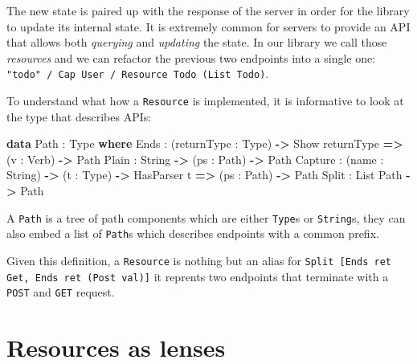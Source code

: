 \documentclass[sigplan,screen,review, nonacm]{acmart}
\newenvironment{Shaded}{}{}
\newcommand{\DataTypeTok}[1]{\textcolor[rgb]{0.56,0.13,0.00}{#1}}
\newcommand{\FunctionTok}[1]{\textcolor[rgb]{0.02,0.16,0.49}{#1}}
\newcommand{\KeywordTok}[1]{\textcolor[rgb]{0.00,0.44,0.13}{\textbf{#1}}}
\newcommand{\OperatorTok}[1]{\textcolor[rgb]{0.40,0.40,0.40}{#1}}
\newcommand{\OtherTok}[1]{\textcolor[rgb]{0.00,0.44,0.13}{#1}}
\newcommand{\StringTok}[1]{\textcolor[rgb]{0.25,0.44,0.63}{#1}}
\begin{document}
The new state is paired up with the response of the server in order for
the library to update its internal state. It is
extremely common for servers to provide an API that allows both
\emph{querying} and \emph{updating} the state. In our library we call
those \emph{resources} and we can refactor the previous two endpoints into a
single one:
\texttt{\StringTok{"todo"}\ \OperatorTok{/}\ \OtherTok{Cap}\ \DataTypeTok{User}\ \OperatorTok{/}\ \OtherTok{Resource}\ \DataTypeTok{Todo}\ (\OtherTok{List}\ \DataTypeTok{Todo})}.

To understand what how a \texttt{Resource} is implemented, it is informative to
look at the type that describes APIs:

\begin{Shaded}
\begin{Highlighting}[]
\KeywordTok{data} \DataTypeTok{Path} : \DataTypeTok{Type} \KeywordTok{where}
  \FunctionTok{Ends} : (returnType : \DataTypeTok{Type}) \KeywordTok{->}
         \OtherTok{Show} returnType \KeywordTok{=>}
         (v : \DataTypeTok{Verb}) \KeywordTok{->} \DataTypeTok{Path}
  \FunctionTok{Plain} : \DataTypeTok{String} \KeywordTok{->} (ps : \DataTypeTok{Path}) \KeywordTok{->} \DataTypeTok{Path}
  \FunctionTok{Capture} : (name : \DataTypeTok{String}) \KeywordTok{->}
            (t : \DataTypeTok{Type}) \KeywordTok{->} \OtherTok{HasParser} t \KeywordTok{=>}
            (ps : \DataTypeTok{Path}) \KeywordTok{->} \DataTypeTok{Path}
  \FunctionTok{Split} : \OtherTok{List} \DataTypeTok{Path} \KeywordTok{->} \DataTypeTok{Path}
\end{Highlighting}
\end{Shaded}

A \texttt{\DataTypeTok{Path}} is a tree of path components which are either
\texttt{\DataTypeTok{Type}}s or \texttt{\DataTypeTok{String}}s,
they can also embed a list of \texttt{\DataTypeTok{Path}}s which describes endpoints with a
common prefix.

Given this definition, a \texttt{\OtherTok{Resource}} is nothing but an alias for
\texttt{\FunctionTok{Split} [\FunctionTok{Ends} ret \DataTypeTok{Get}, \FunctionTok{Ends} ret (\OtherTok{Post} val)]}
it reprents two endpoints that terminate with a \texttt{POST} and
\texttt{GET} request.


\hypertarget{resources-as-lenses}{%
\section{Resources as lenses}\label{resources-as-lenses}}
\end{document}
